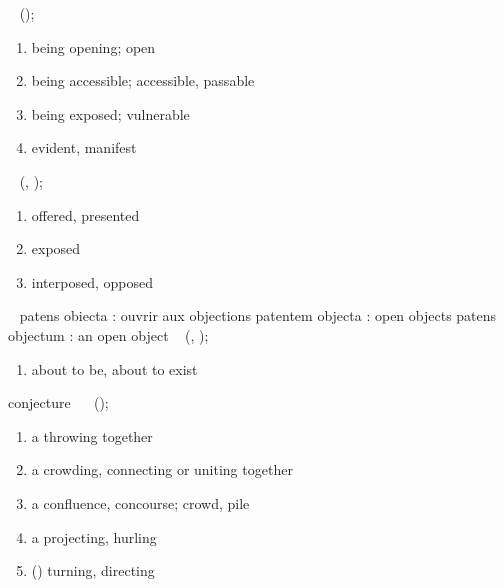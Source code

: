 \bigskip



~
();
\liststyleLii
\begin{enumerate}
\item being opening; open 
\item being accessible; accessible, passable 
\item being exposed; vulnerable 
\item evident, manifest 
\end{enumerate}
~
(,
);
\liststyleLiii
\begin{enumerate}
\item offered, presented 
\item exposed 
\item interposed, opposed 
\end{enumerate}
~
patens obiecta : ouvrir aux objections
patentem objecta : open objects
patens objectum : an open object
~
(,
);
\liststyleLiv
\begin{enumerate}
\item about to be, about to exist 
\end{enumerate}
conjecture~
~
();
\liststyleLv
\begin{enumerate}
\item a throwing together 
\item a crowding, connecting or uniting together 
\item a confluence, concourse; crowd, pile 
\item a projecting, hurling 
\item () turning,
directing 
\end{enumerate}
